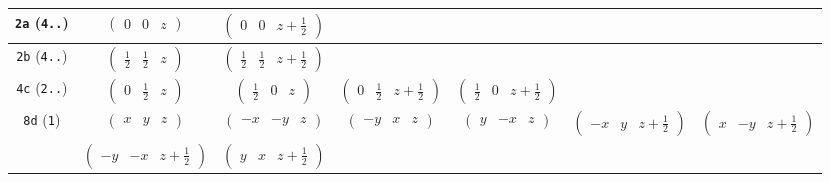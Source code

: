 \documentclass[fleqn,9pt,landscape]{jsarticle}
\begin{document}
\begin{center}
\begin{longtable}{ccccccc}
{\tt 2a} ({\tt 4..}) & $ \begin{pmatrix} 0 & 0 & z \end{pmatrix} $ & $ \begin{pmatrix} 0 & 0 & z + \frac{1}{2} \end{pmatrix} $ & $  $ & $  $ & $  $ & $  $ \\ \hline
{\tt 2b} ({\tt 4..}) & $ \begin{pmatrix} \frac{1}{2} & \frac{1}{2} & z \end{pmatrix} $ & $ \begin{pmatrix} \frac{1}{2} & \frac{1}{2} & z + \frac{1}{2} \end{pmatrix} $ & $  $ & $  $ & $  $ & $  $ \\ \hline
{\tt 4c} ({\tt 2..}) & $ \begin{pmatrix} 0 & \frac{1}{2} & z \end{pmatrix} $ & $ \begin{pmatrix} \frac{1}{2} & 0 & z \end{pmatrix} $ & $ \begin{pmatrix} 0 & \frac{1}{2} & z + \frac{1}{2} \end{pmatrix} $ & $ \begin{pmatrix} \frac{1}{2} & 0 & z + \frac{1}{2} \end{pmatrix} $ & $  $ & $  $ \\ \hline
{\tt 8d} ({\tt 1}) & $ \begin{pmatrix} x & y & z \end{pmatrix} $ & $ \begin{pmatrix} - x & - y & z \end{pmatrix} $ & $ \begin{pmatrix} - y & x & z \end{pmatrix} $ & $ \begin{pmatrix} y & - x & z \end{pmatrix} $ & $ \begin{pmatrix} - x & y & z + \frac{1}{2} \end{pmatrix} $ & $ \begin{pmatrix} x & - y & z + \frac{1}{2} \end{pmatrix} $ \\
& $ \begin{pmatrix} - y & - x & z + \frac{1}{2} \end{pmatrix} $ & $ \begin{pmatrix} y & x & z + \frac{1}{2} \end{pmatrix} $ & $  $ & $  $ & $  $ & $  $ \\
\end{longtable}
\end{center}
\end{document}

